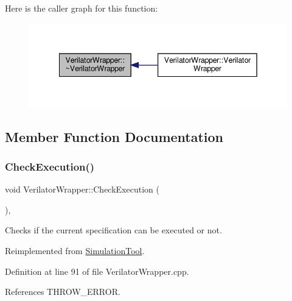 Here is the caller graph for this function\+:
\nopagebreak
\begin{figure}[H]
\begin{center}
\leavevmode
\includegraphics[width=342pt]{da/d8c/classVerilatorWrapper_a0b67c3978509743ceee226ea10a9fcdd_icgraph}
\end{center}
\end{figure}


\subsection{Member Function Documentation}
\mbox{\label{classVerilatorWrapper_ade8f594c94962542008b87f5b0beff70}} 
\subsubsection{\texorpdfstring{Check\+Execution()}{CheckExecution()}}
{\footnotesize\ttfamily void Verilator\+Wrapper\+::\+Check\+Execution (\begin{DoxyParamCaption}{ }\end{DoxyParamCaption})\hspace{0.3cm}{\ttfamily [override]}, {\ttfamily [virtual]}}



Checks if the current specification can be executed or not. 



Reimplemented from \hyperlink{classSimulationTool_a24b4cde0b09c7496918d20f3896989b6}{Simulation\+Tool}.



Definition at line 91 of file Verilator\+Wrapper.\+cpp.



References T\+H\+R\+O\+W\+\_\+\+E\+R\+R\+OR.

\mbox{\label{classVerilatorWrapper_adfffb92b6facd27a89a6e6999b671ea6}} 
